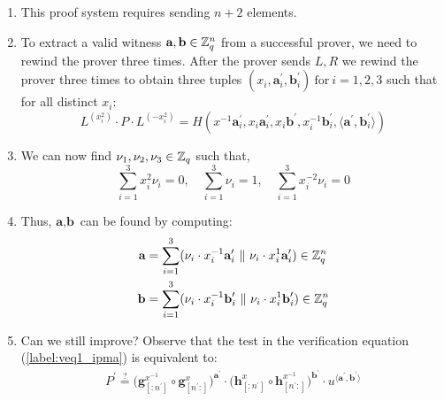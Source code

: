 \begin{enumerate}
    \item This proof system requires sending $n+2$ elements.
        \item To extract a valid witness $\textbf{a}, \textbf{b} \in \mathbb{Z}^n_q$ from a successful prover, we need to rewind the prover three times. After the prover sends $L, R$ we rewind the prover three times to obtain three tuples $(x_i, \textbf{a}_i^{\prime}, \textbf{b}_i^{\prime}) \ \text{for} \ i=1,2,3$ such that for all distinct $x_i$:  
        \begin{equation}
            L^{(x_i^2)}\cdot P \cdot L^{({-x}_i^2)}
            =
            H(x^{-1}\textbf{a}^{\prime}_i, x_i\textbf{a}^{\prime}_i, x_i\textbf{b}^{\prime}, x_i^{-1}\textbf{b}^{\prime}_i, 
            \langle \textbf{a}^{\prime}, \textbf{b}^{\prime}_i \rangle)
        \end{equation}
        
    \item We can now find $\nu_1, \nu_2, \nu_3 \in \mathbb{Z}_q$ such that,
    \begin{equation*}
        \sum_{i=1}^{3}x_i^2 \nu_i=0, \quad 
        \sum_{i=1}^{3}\nu_i = 1, \quad
        \sum_{i=1}^{3}x_i^{-2} \nu_i=0
    \end{equation*}
    
    \item Thus, $\textbf{a}, \textbf{b}$ can be found by computing:
    \begin{align*}
        \textbf{a} &= \sum_{i=1}^{3}(\nu_i \cdot x_i^{-1} \textbf{a}_i^{\prime} \ \| \ \nu_i \cdot x_i^{1} \textbf{a}_i^{\prime}) \in \mathbb{Z}_q^n\\
        \textbf{b} &= \sum_{i=1}^{3}(\nu_i \cdot x_i^{-1} \textbf{b}_i^{\prime} \ \| \ \nu_i \cdot x_i^{1} \textbf{b}_i^{\prime}) \in \mathbb{Z}_q^n
    \end{align*}
        
    \item Can we still improve? Observe that the test in the verification equation (\ref{label:veq1_ipma}) is equivalent to:
    \begin{align*}
    P^{\prime} \stackrel{?}{=} 
    \big(
    \textbf{g}^{x^{-1}}_{[:n^{\prime}]} \circ \textbf{g}^x_{[n^{\prime}:]}
    \big)^{\textbf{a}^{\prime}}
    \cdot
    \big(
    \textbf{h}^x_{[:n^{\prime}]} \circ \textbf{h}^{x^{-1}}_{[n^{\prime}:]}
    \big)^{\textbf{b}^{\prime}}
    \cdot 
    u^{\langle \textbf{a}^{\prime},\textbf{b}^{\prime} \rangle}
    \end{align*}


\end{enumerate}
